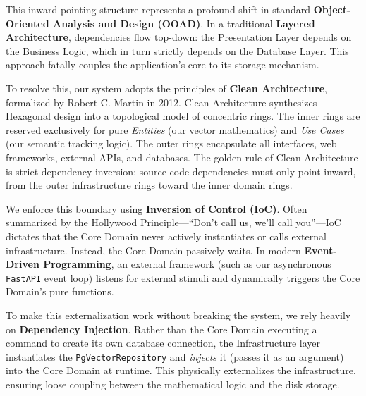 
This inward-pointing structure represents a profound shift in standard \textbf{Object-Oriented Analysis and Design (OOAD)}. In a traditional \textbf{Layered Architecture}, dependencies flow top-down: the Presentation Layer depends on the Business Logic, which in turn strictly depends on the Database Layer. This approach fatally couples the application's core to its storage mechanism.

To resolve this, our system adopts the principles of \textbf{Clean Architecture}, formalized by Robert C. Martin in 2012. Clean Architecture synthesizes Hexagonal design into a topological model of concentric rings. The inner rings are reserved exclusively for pure \textit{Entities} (our vector mathematics) and \textit{Use Cases} (our semantic tracking logic). The outer rings encapsulate all interfaces, web frameworks, external APIs, and databases. The golden rule of Clean Architecture is strict dependency inversion: source code dependencies must only point inward, from the outer infrastructure rings toward the inner domain rings.

We enforce this boundary using \textbf{Inversion of Control (IoC)}. Often summarized by the Hollywood Principle---``Don't call us, we'll call you''---IoC dictates that the Core Domain never actively instantiates or calls external infrastructure. Instead, the Core Domain passively waits. In modern \textbf{Event-Driven Programming}, an external framework (such as our asynchronous \texttt{FastAPI} event loop) listens for external stimuli and dynamically triggers the Core Domain's pure functions.

To make this externalization work without breaking the system, we rely heavily on \textbf{Dependency Injection}. Rather than the Core Domain executing a command to create its own database connection, the Infrastructure layer instantiates the \texttt{PgVectorRepository} and \textit{injects} it (passes it as an argument) into the Core Domain at runtime. This physically externalizes the infrastructure, ensuring loose coupling between the mathematical logic and the disk storage.

